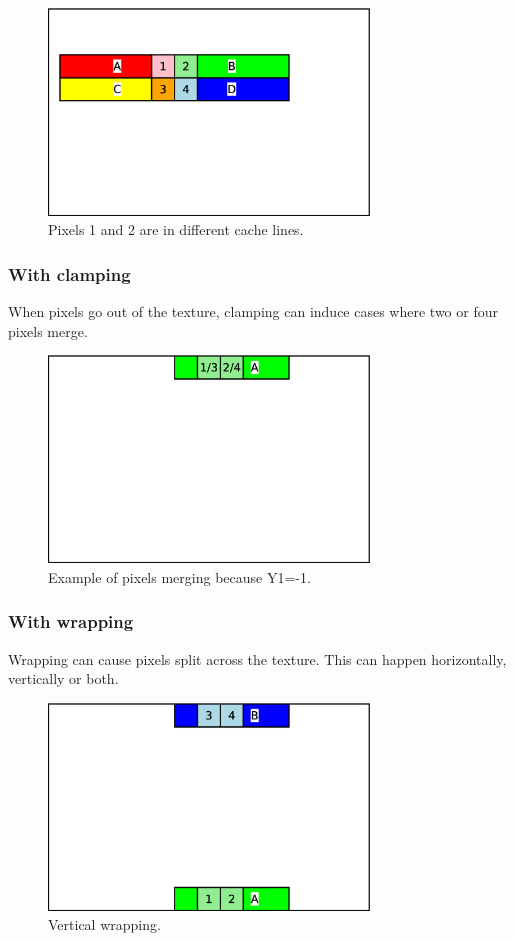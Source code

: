 \documentclass[a4paper,11pt]{article}
\begin{document}
\begin{figure}[H]
\centering
\includegraphics[height=55mm]{dist_12lines.eps}
\caption{Pixels 1 and 2 are in different cache lines.}\label{fig:case2}
\end{figure}

\subsubsection{With clamping}
When pixels go out of the texture, clamping can induce cases where two or four pixels merge.

\begin{figure}[H]
\centering
\includegraphics[height=55mm]{dist_clamp.eps}
\caption{Example of pixels merging because Y1=-1.}\label{fig:caseclamp}
\end{figure}

\subsubsection{With wrapping}
Wrapping can cause pixels split across the texture. This can happen horizontally, vertically or both.

\begin{figure}[H]
\centering
\includegraphics[height=55mm]{dist_wrap1.eps}
\caption{Vertical wrapping.}\label{fig:casewrap1}
\end{figure}
\end{document}
